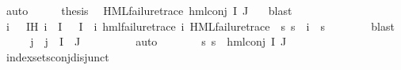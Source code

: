 \begin{isabellebody}
\ auto\isanewline
\ \ \isamarkupfalse%
\ \isamarkupfalse%
\ {\isacharquery}{\kern0pt}thesis\ \isamarkupfalse%
\ {\isacartoucheopen}HML{\isacharunderscore}{\kern0pt}failure{\isacharunderscore}{\kern0pt}trace\ {\isacharparenleft}{\kern0pt}hml{\isacharunderscore}{\kern0pt}conj\ I\ J\ {\isasymPsi}{\isacharparenright}{\kern0pt}{\isacartoucheclose}\ \isamarkupfalse%
\ blast\isanewline
{}\isamarkupfalse%
\isanewline
\ \ \isamarkupfalse%
\ {}\isanewline
\ \ \isamarkupfalse%
\ \isamarkupfalse%
\ i\ {\isasympsi}\ \ IH{\isacharcolon}{\kern0pt}\ {\isachardoublequoteopen}i{\isasymin}{\isasymPhi}\ {\isacharbackquote}{\kern0pt}\ I{\isachardoublequoteclose}\ {\isachardoublequoteopen}{\isasymPhi}\ {\isacharbackquote}{\kern0pt}\ I\ {\isacharequal}{\kern0pt}\ {\isacharbraceleft}{\kern0pt}i{\isacharbraceright}{\kern0pt}{\isachardoublequoteclose}\ {\isachardoublequoteopen}hml{\isacharunderscore}{\kern0pt}failure{\isacharunderscore}{\kern0pt}trace\ i{\isachardoublequoteclose}\ {\isachardoublequoteopen}HML{\isacharunderscore}{\kern0pt}failure{\isacharunderscore}{\kern0pt}trace\ {\isasympsi}{\isachardoublequoteclose}\ {\isachardoublequoteopen}{\isacharparenleft}{\kern0pt}{\isasymforall}s{\isachardot}{\kern0pt}\ {\isacharparenleft}{\kern0pt}s\ {\isasymTurnstile}\ i{\isacharparenright}{\kern0pt}\ {\isacharequal}{\kern0pt}\ {\isacharparenleft}{\kern0pt}s\ {\isasymTurnstile}\ {\isasympsi}{\isacharparenright}{\kern0pt}{\isacharparenright}{\kern0pt}{\isachardoublequoteclose}\isanewline
\ \ \ \ \isamarkupfalse%
\ blast\isanewline
\ \ \isamarkupfalse%
\ \isamarkupfalse%
\ j\ \ {\isachardoublequoteopen}j\ {\isasymin}\ I\ {\isasyminter}\ J{\isachardoublequoteclose}\ \isanewline
\ \ \ \ \isamarkupfalse%
\ {\isachardoublequoteopen}{}{\isachardoublequoteclose}\ \isamarkupfalse%
\ auto\ \isanewline
\ \ \isamarkupfalse%
\ {}\ \isamarkupfalse%
\ {\isachardoublequoteopen}{\isacharparenleft}{\kern0pt}{\isasymforall}s{\isachardot}{\kern0pt}\ {\isasymnot}{\isacharparenleft}{\kern0pt}s\ {\isasymTurnstile}\ hml{\isacharunderscore}{\kern0pt}conj\ I\ J\ {\isasymPhi}{\isacharparenright}{\kern0pt}{\isacharparenright}{\kern0pt}{\isachardoublequoteclose}\isanewline
\ \ \ \ \isamarkupfalse%
\ index{\isacharunderscore}{\kern0pt}sets{\isacharunderscore}{\kern0pt}conj{\isacharunderscore}{\kern0pt}disjunct\ \isanewline

\end{isabellebody}
